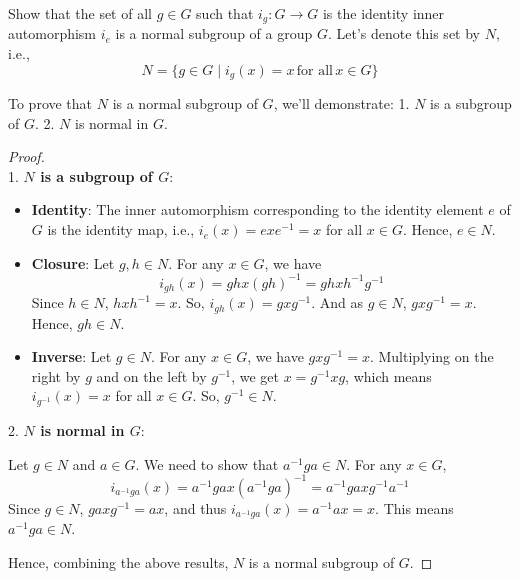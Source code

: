 \documentclass[12pt]{amsart}
\theoremstyle{definition}
\numberwithin{equation}{section}
\theoremstyle{plain}
\begin{document}
\begin{exercise}{38} Show that the set of all $g\in G$ such that $i_g: G \rightarrow G$ is the identity inner automorphism $i_e$ is a normal subgroup of a group $G$.
    Let's denote this set by \( N \), i.e., 
    \[ N = \{ g \in G \mid i_g(x) = x \, \text{for all} \, x \in G \} \]
    
    To prove that \( N \) is a normal subgroup of \( G \), we'll demonstrate:
    1. \( N \) is a subgroup of \( G \).
    2. \( N \) is normal in \( G \).
    
    \begin{proof} $ $ \\
    
    1. \textbf{\( N \) is a subgroup of \( G \)}:
       
      \begin{itemize}
        \item \textbf{Identity}: The inner automorphism corresponding to the identity element \( e \) of \( G \) is the identity map, i.e., \( i_e(x) = exe^{-1} = x \) for all \( x \in G \). Hence, \( e \in N \).
         
        \item \textbf{Closure}: Let \( g, h \in N \). For any \( x \in G \), we have
           \[ i_{gh}(x) = ghx(gh)^{-1} = ghxh^{-1}g^{-1} \]
           Since \( h \in N \), \( hxh^{-1} = x \). So, \( i_{gh}(x) = gxg^{-1} \). And as \( g \in N \), \( gxg^{-1} = x \). Hence, \( gh \in N \).
         
        \item \textbf{Inverse}: Let \( g \in N \). For any \( x \in G \), we have \( gxg^{-1} = x \). Multiplying on the right by \( g \) and on the left by \( g^{-1} \), we get \( x = g^{-1}xg \), which means \( i_{g^{-1}}(x) = x \) for all \( x \in G \). So, \( g^{-1} \in N \).
      
      \end{itemize}
    2. \textbf{\( N \) is normal in \( G \)}:
    
       Let \( g \in N \) and \( a \in G \). We need to show that \( a^{-1}ga \in N \). For any \( x \in G \), 
       \[ i_{a^{-1}ga}(x) = a^{-1}gax(a^{-1}ga)^{-1} = a^{-1}gaxg^{-1}a^{-1} \]
       Since \( g \in N \), \( gaxg^{-1} = ax \), and thus \( i_{a^{-1}ga}(x) = a^{-1}ax = x \). This means \( a^{-1}ga \in N \).
    
    Hence, combining the above results, \( N \) is a normal subgroup of \( G \).
    
    \end{proof}
    
\end{exercise}
\end{document}
